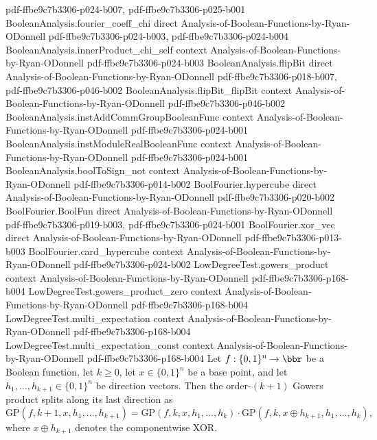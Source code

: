 \begin{lemma}
  {pdf-ffbe9c7b3306-p024-b007,
    pdf-ffbe9c7b3306-p025-b001}
\proofstep
  {BooleanAnalysis.fourier_coeff_chi}
  {direct}
  {Analysis-of-Boolean-Functions-by-Ryan-ODonnell}
  {pdf-ffbe9c7b3306-p024-b003,
    pdf-ffbe9c7b3306-p024-b004}
\proofstep
  {BooleanAnalysis.innerProduct_chi_self}
  {context}
  {Analysis-of-Boolean-Functions-by-Ryan-ODonnell}
  {pdf-ffbe9c7b3306-p024-b003}
\proofstep
  {BooleanAnalysis.flipBit}
  {direct}
  {Analysis-of-Boolean-Functions-by-Ryan-ODonnell}
  {pdf-ffbe9c7b3306-p018-b007,
    pdf-ffbe9c7b3306-p046-b002}
\proofstep
  {BooleanAnalysis.flipBit_flipBit}
  {context}
  {Analysis-of-Boolean-Functions-by-Ryan-ODonnell}
  {pdf-ffbe9c7b3306-p046-b002}
\proofstep
  {BooleanAnalysis.instAddCommGroupBooleanFunc}
  {context}
  {Analysis-of-Boolean-Functions-by-Ryan-ODonnell}
  {pdf-ffbe9c7b3306-p024-b001}
\proofstep
  {BooleanAnalysis.instModuleRealBooleanFunc}
  {context}
  {Analysis-of-Boolean-Functions-by-Ryan-ODonnell}
  {pdf-ffbe9c7b3306-p024-b001}
\proofstep
  {BooleanAnalysis.boolToSign_not}
  {context}
  {Analysis-of-Boolean-Functions-by-Ryan-ODonnell}
  {pdf-ffbe9c7b3306-p014-b002}
\proofstep
  {BoolFourier.hypercube}
  {direct}
  {Analysis-of-Boolean-Functions-by-Ryan-ODonnell}
  {pdf-ffbe9c7b3306-p020-b002}
\proofstep
  {BoolFourier.BoolFun}
  {direct}
  {Analysis-of-Boolean-Functions-by-Ryan-ODonnell}
  {pdf-ffbe9c7b3306-p019-b003,
    pdf-ffbe9c7b3306-p024-b001}
\proofstep
  {BoolFourier.xor_vec}
  {direct}
  {Analysis-of-Boolean-Functions-by-Ryan-ODonnell}
  {pdf-ffbe9c7b3306-p013-b003}
\proofstep
  {BoolFourier.card_hypercube}
  {context}
  {Analysis-of-Boolean-Functions-by-Ryan-ODonnell}
  {pdf-ffbe9c7b3306-p024-b002}
\proofstep
  {LowDegreeTest.gowers_product}
  {context}
  {Analysis-of-Boolean-Functions-by-Ryan-ODonnell}
  {pdf-ffbe9c7b3306-p168-b004}
\proofstep
  {LowDegreeTest.gowers_product_zero}
  {context}
  {Analysis-of-Boolean-Functions-by-Ryan-ODonnell}
  {pdf-ffbe9c7b3306-p168-b004}
\proofstep
  {LowDegreeTest.multi_expectation}
  {context}
  {Analysis-of-Boolean-Functions-by-Ryan-ODonnell}
  {pdf-ffbe9c7b3306-p168-b004}
\proofstep
  {LowDegreeTest.multi_expectation_const}
  {context}
  {Analysis-of-Boolean-Functions-by-Ryan-ODonnell}
  {pdf-ffbe9c7b3306-p168-b004}
Let $f : \{0,1\}^n \to \bbr$ be a Boolean function, let $k \ge 0$, let $x \in \{0,1\}^n$
be a base point, and let $h_1, \ldots, h_{k+1} \in \{0,1\}^n$ be direction vectors. Then
the order-$(k{+}1)$ Gowers product splits along its last direction as
\[
  \mathrm{GP}(f, k{+}1, x, h_1, \ldots, h_{k+1})
  = \mathrm{GP}(f, k, x, h_1, \ldots, h_k)
    \cdot \mathrm{GP}(f, k, x \oplus h_{k+1}, h_1, \ldots, h_k),
\]
where $x \oplus h_{k+1}$ denotes the componentwise XOR.
\end{lemma}

